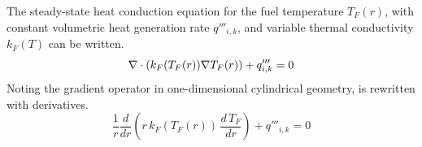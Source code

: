       The steady-state heat conduction equation for the fuel temperature
      $T_F(r)$, with constant volumetric heat generation rate $q'''_{i,k}$, and
      variable thermal conductivity $k_F(T)$ can be written.
      \begin{equation}
        \label{eq:conduction_fuel}
        \mathbf{\nabla} \cdot (k_F(T_F(r)) \mathbf{\nabla} T_F(r)) + q'''_{i,k} = 0
      \end{equation}
      Noting the gradient operator in one-dimensional cylindrical geometry,
       is rewritten with derivatives.
      \begin{equation}
        \label{eq:conduction_fuel_cylindrical}
        \frac{1}{r} \frac{d}{dr} \left( r \, k_F(T_F(r)) \, 
          \frac{d \, T_F}{dr} \right) + q'''_{i,k} = 0
      \end{equation}

